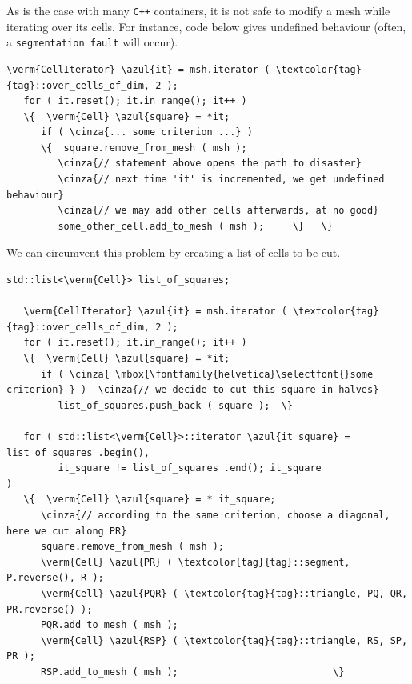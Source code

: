 As is the case with many {\tt C++} containers, it is not safe to modify a mesh while
iterating over its cells.
For instance, code below gives undefined behaviour (often, a {\small\tt segmentation fault}
will occur).

\begin{Verbatim}[commandchars=\\\{\},formatcom=\small\tt,frame=single,
   label=incorrect code !,rulecolor=\color{coment},
   baselinestretch=0.94,framesep=2mm]
   \verm{CellIterator} \azul{it} = msh.iterator ( \textcolor{tag}{tag}::over_cells_of_dim, 2 );
   for ( it.reset(); it.in_range(); it++ )
   \{  \verm{Cell} \azul{square} = *it;
      if ( \cinza{... some criterion ...} )
      \{  square.remove_from_mesh ( msh );
         \cinza{// statement above opens the path to disaster}
         \cinza{// next time 'it' is incremented, we get undefined behaviour}
         \cinza{// we may add other cells afterwards, at no good}
         some_other_cell.add_to_mesh ( msh );     \}   \}
\end{Verbatim}

We can circumvent this problem by creating a list of cells to be cut.

\begin{Verbatim}[commandchars=\\\{\},formatcom=\small\tt,frame=single,
   label=parag-\ref{\numb section 10.\numb parag 3}.cpp,rulecolor=\color{coment},
   baselinestretch=0.94,framesep=2mm]
   std::list<\verm{Cell}> list_of_squares;

   \verm{CellIterator} \azul{it} = msh.iterator ( \textcolor{tag}{tag}::over_cells_of_dim, 2 );
   for ( it.reset(); it.in_range(); it++ )
   \{  \verm{Cell} \azul{square} = *it;
      if ( \cinza{ \mbox{\fontfamily{helvetica}\selectfont{}some criterion} } )  \cinza{// we decide to cut this square in halves}
         list_of_squares.push_back ( square );  \}

   for ( std::list<\verm{Cell}>::iterator \azul{it_square} = list_of_squares .begin(),
         it_square != list_of_squares .end(); it_square               )
   \{  \verm{Cell} \azul{square} = * it_square;
      \cinza{// according to the same criterion, choose a diagonal, here we cut along PR}
      square.remove_from_mesh ( msh );
      \verm{Cell} \azul{PR} ( \textcolor{tag}{tag}::segment, P.reverse(), R );
      \verm{Cell} \azul{PQR} ( \textcolor{tag}{tag}::triangle, PQ, QR, PR.reverse() );
      PQR.add_to_mesh ( msh );
      \verm{Cell} \azul{RSP} ( \textcolor{tag}{tag}::triangle, RS, SP, PR );
      RSP.add_to_mesh ( msh );                           \}
\end{Verbatim}


